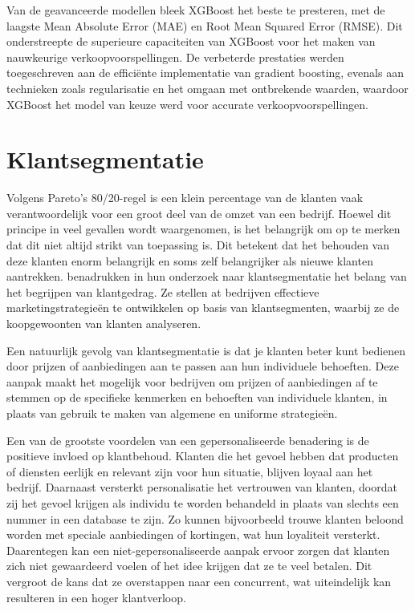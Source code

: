 \vspace{1 em}

Van de geavanceerde modellen bleek XGBoost het beste te presteren, met de laagste Mean Absolute Error (MAE) en Root Mean Squared Error (RMSE). Dit onderstreepte de superieure capaciteiten van XGBoost voor het maken van nauwkeurige verkoopvoorspellingen. De verbeterde prestaties werden toegeschreven aan de efficiënte implementatie van gradient boosting, evenals aan technieken zoals regularisatie en het omgaan met ontbrekende waarden, waardoor XGBoost het model van keuze werd voor accurate verkoopvoorspellingen.

\vspace{10 mm}

\section{Klantsegmentatie}  

Volgens Pareto’s 80/20-regel is een klein percentage van de klanten vaak verantwoordelijk voor een groot deel van de omzet van een bedrijf. Hoewel dit principe in veel gevallen wordt waargenomen, is het belangrijk om op te merken dat dit niet altijd strikt van toepassing is. Dit betekent dat het behouden van deze klanten enorm belangrijk en soms zelf belangrijker als nieuwe klanten aantrekken. \textcite{Wu2011} benadrukken in hun onderzoek naar klantsegmentatie het belang van het begrijpen van klantgedrag. Ze stellen at bedrijven effectieve marketingstrategieën te ontwikkelen op basis van klantsegmenten, waarbij ze de koopgewoonten van klanten analyseren. 

\vspace{1 em}

Een natuurlijk gevolg van klantsegmentatie is dat je klanten beter kunt bedienen door prijzen of aanbiedingen aan te passen aan hun individuele behoeften. Deze aanpak maakt het mogelijk voor bedrijven om prijzen of aanbiedingen af te stemmen op de specifieke kenmerken en behoeften van individuele klanten, in plaats van gebruik te maken van algemene en uniforme strategieën.

\vspace{1 em}

Een van de grootste voordelen van een gepersonaliseerde benadering is de positieve invloed op klantbehoud. Klanten die het gevoel hebben dat producten of diensten eerlijk en relevant zijn voor hun situatie, blijven loyaal aan het bedrijf. Daarnaast versterkt personalisatie het vertrouwen van klanten, doordat zij het gevoel krijgen als individu te worden behandeld in plaats van slechts een nummer in een database te zijn. Zo kunnen bijvoorbeeld trouwe klanten beloond worden met speciale aanbiedingen of kortingen, wat hun loyaliteit versterkt. Daarentegen kan een niet-gepersonaliseerde aanpak ervoor zorgen dat klanten zich niet gewaardeerd voelen of het idee krijgen dat ze te veel betalen. Dit vergroot de kans dat ze overstappen naar een concurrent, wat uiteindelijk kan resulteren in een hoger klantverloop.\autocite{Adeniran2024}

